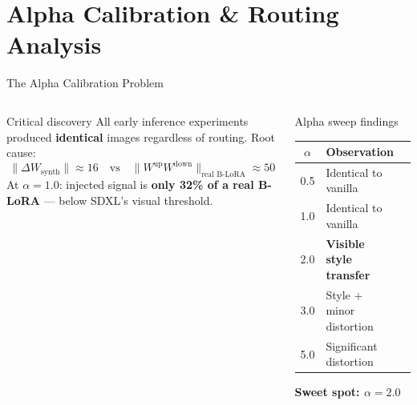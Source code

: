 \documentclass[aspectratio=169,10pt]{beamer}
\begin{document}
\section{Alpha Calibration \& Routing Analysis}

\begin{frame}[shrink=10]{The Alpha Calibration Problem}
  \begin{columns}[T]
      \begin{alertblock}{Critical discovery}
        All early inference experiments produced \textbf{identical} images
        regardless of routing. Root cause:
        \[
          \|\Delta W_\text{synth}\| \approx 16 \quad \text{vs} \quad \|W^\text{up} W^\text{down}\|_\text{real B-LoRA} \approx 50
        \]
        At $\alpha = 1.0$: injected signal is \textbf{only 32\% of a real B-LoRA} — below SDXL's visual threshold.
      \end{alertblock}
      \begin{block}{Alpha sweep findings}
        \begin{center}
        \begin{tabular}{cll}
          \toprule
          $\alpha$ & Observation \\
          \midrule
          0.5 & Identical to vanilla \\
          1.0 & Identical to vanilla \\
          2.0 & \textcolor{mygreen}{\textbf{Visible style transfer}} \\
          3.0 & Style + minor distortion \\
          5.0 & Significant distortion \\
          \bottomrule
        \end{tabular}
        \end{center}
        \textbf{Sweet spot: $\alpha = 2.0$}
      \end{block}


\end{columns}
\end{frame}
\end{document}
